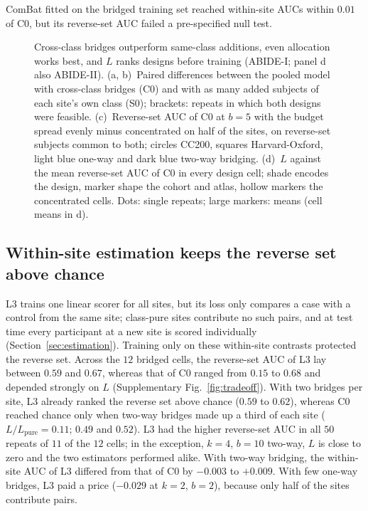 ComBat fitted on the bridged training set reached within-site AUCs within $0.01$ of C0, but its reverse-set AUC failed a pre-specified null test.

\begin{figure}[tbp]
\centering
{}
\caption{Cross-class bridges outperform same-class additions, even allocation works best, and $L$ ranks designs before training (ABIDE-I; panel d also ABIDE-II). (a, b)~Paired differences between the pooled model with cross-class bridges (C0) and with as many added subjects of each site's own class (S0); brackets: repeats in which both designs were feasible. (c)~Reverse-set AUC of C0 at $b=5$ with the budget spread evenly minus concentrated on half of the sites, on reverse-set subjects common to both; circles CC200, squares Harvard-Oxford, light blue one-way and dark blue two-way bridging. (d)~$L$ against the mean reverse-set AUC of C0 in every design cell; shade encodes the design, marker shape the cohort and atlas, hollow markers the concentrated cells. Dots: single repeats; large markers: means (cell means in d).}
\label{fig:bridging}
\end{figure}

\subsection{Within-site estimation keeps the reverse set above chance}\label{sec:res-within}

L3 trains one linear scorer for all sites, but its loss only compares a case with a control from the same site; class-pure sites contribute no such pairs, and at test time every participant at a new site is scored individually (Section~\ref{sec:estimation}). Training only on these within-site contrasts protected the reverse set. Across the $12$ bridged cells, the reverse-set AUC of L3 lay between $0.59$ and $0.67$, whereas that of C0 ranged from $0.15$ to $0.68$ and depended strongly on $L$ (Supplementary Fig.~\ref{fig:tradeoff}). With two bridges per site, L3 already ranked the reverse set above chance ($0.59$ to $0.62$), whereas C0 reached chance only when two-way bridges made up a third of each site ($L/L_{\mathrm{pure}}=0.11$; $0.49$ and $0.52$). L3 had the higher reverse-set AUC in all $50$ repeats of $11$ of the $12$ cells; in the exception, $k=4$, $b=10$ two-way, $L$ is close to zero and the two estimators performed alike. With two-way bridging, the within-site AUC of L3 differed from that of C0 by $-0.003$ to $+0.009$. With few one-way bridges, L3 paid a price ($-0.029$ at $k=2$, $b=2$), because only half of the sites contribute pairs.

